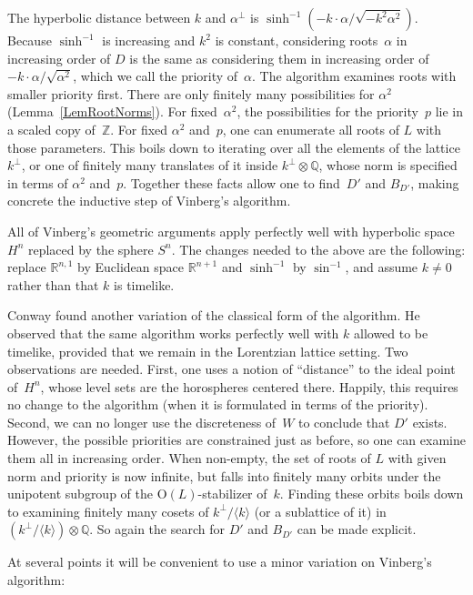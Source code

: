 \documentclass[12pt]{amsart}
\def\gend#1{\langle#1\rangle}
\def\R{\mathbb{R}}
\def\O{\mathrm{O}}
\def\Z{\mathbb{Z}}
\def\Q{\mathbb{Q}}
\def\tensor{\otimes}
\numberwithin{theorem}{section}
\numberwithin{equation}{section}
\numberwithin{figure}{section}
\theoremstyle{remark}
\begin{document}
The hyperbolic distance between $k$ and $\alpha^\perp$ is
$
\sinh^{-1}(-k\cdot \alpha/\sqrt{-k^2 \alpha^2})
$.
Because $\sinh^{-1}$ is
increasing and $k^2$ is constant, considering roots~$\alpha$ in increasing order of
$D$ is the same as considering them in
increasing order of~$-k\cdot \alpha/\sqrt{\alpha^2}$,
which we call  the  priority of~$\alpha$.  
The algorithm examines roots with smaller priority first.
There are only finitely many possibilities for $\alpha^2$ (Lemma~\ref{LemRootNorms}).
For fixed~$\alpha^2$, the 
possibilities for the priority~$p$ lie in a scaled copy of~$\Z$.
For fixed $\alpha^2$ and~$p$, one can
enumerate all roots of $L$ with those parameters.
This boils down to iterating
over all the elements of the lattice $k^\perp$, 
or one of finitely many translates of it inside $k^\perp\tensor\Q$,
whose norm is specified in terms of $\alpha^2$ and~$p$.
Together these facts  allow one to find~$D'$ and $B_{D'}$, making
concrete the 
inductive step of Vinberg's algorithm. 

\medskip
All of Vinberg's geometric arguments apply perfectly well with hyperbolic
space  $H^n$ replaced by the sphere
$S^n$.  
The changes needed to the above are the following:  replace $\R^{n,1}$ by 
Euclidean space $\R^{n+1}$ and
$\sinh^{-1}$ by $\sin^{-1}$, and
assume $k\neq0$ rather than that $k$ is timelike.  

\medskip
Conway \cite{Conway} found another variation of the classical form of the algorithm.
He observed that the same algorithm works
perfectly well with $k$ allowed to be timelike, provided that
we remain in the Lorentzian lattice setting.  Two
observations are needed.  First, one uses a notion of ``distance'' to
the ideal point of~$H^n$, whose level sets are the horospheres centered
there.
Happily, 
this requires no change to the algorithm (when it is formulated in terms of
the priority).
Second, we can
no longer use the discreteness of~$W$ to conclude that $D'$ exists.
However, the possible priorities are constrained just as before,
so one can examine them all in increasing order.
When non-empty, the set of roots of $L$ with
given norm and priority is now infinite, but 
falls into finitely many orbits under the unipotent
subgroup of the $\O(L)$-stabilizer of~$k$.
Finding these orbits 
boils down to examining finitely many cosets of  $k^\perp/\gend{k}$ 
(or a sublattice of it) in 
$(k^\perp/\gend{k})\tensor\Q$.   So again the search for $D'$ and $B_{D'}$
can be made explicit.

\medskip
At several points it will be convenient to use a minor variation
on Vinberg's algorithm:
\end{document}

